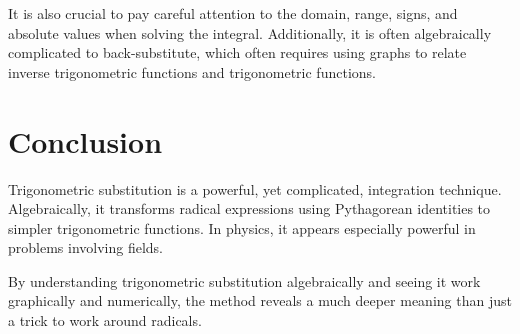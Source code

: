 \documentclass[12pt]{article}
\begin{document}
It is also crucial to pay careful attention to the domain, range, signs, and absolute values when solving the integral. Additionally, it is often algebraically complicated to back-substitute, which often requires using graphs to relate inverse trigonometric functions and trigonometric functions.

\section{Conclusion}

Trigonometric substitution is a powerful, yet complicated, integration technique. Algebraically, it transforms radical expressions using Pythagorean identities to simpler trigonometric functions. In physics, it appears especially powerful in problems involving fields.

By understanding trigonometric substitution algebraically and seeing it work graphically and numerically, the method reveals a much deeper meaning than just a trick to work around radicals.
\end{document}
